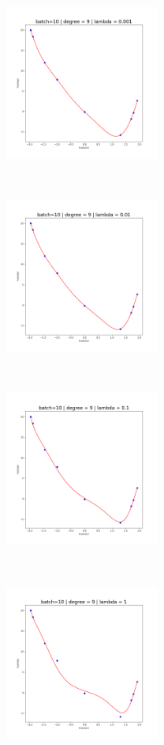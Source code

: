 \newpage
\begin{figure}[!ht]
    \centering
    \begin{subfigure}[ht]{0.5\textwidth}
        \centering
        \includegraphics[height=2in]{Task 1 Images/Batch 10/Figure_5.png}
    \end{subfigure}%
    ~ 
    \begin{subfigure}[ht]{0.5\textwidth}
        \centering
        \includegraphics[height=2in]{Task 1 Images/Batch 10/Figure_6.png}
    \end{subfigure}%
    ~
    
    \begin{subfigure}[ht]{0.5\textwidth}
        \centering
        \includegraphics[height=2in]{Task 1 Images/Batch 10/Figure_7.png}
    \end{subfigure}%
    ~ 
    \begin{subfigure}[ht]{0.5\textwidth}
        \centering
        \includegraphics[height=2in]{Task 1 Images/Batch 10/Figure_8.png}
    \end{subfigure}%
    
\end{figure}

